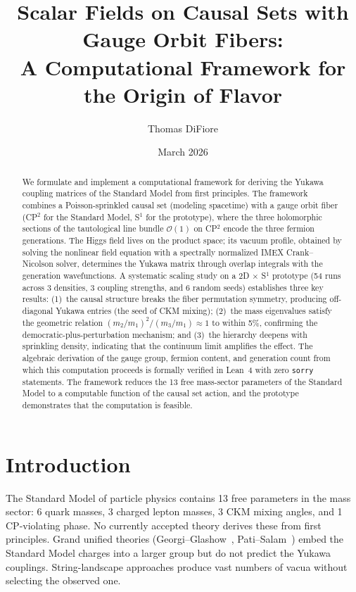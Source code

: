 \documentclass[12pt,a4paper]{article}
\title{Scalar Fields on Causal Sets with Gauge Orbit Fibers:\\
A Computational Framework for the Origin of Flavor}
\author{Thomas DiFiore}
\date{March 2026}
\begin{document}
\maketitle

\begin{abstract}
We formulate and implement a computational framework for deriving the
Yukawa coupling matrices of the Standard Model from first principles.
The framework combines a Poisson-sprinkled causal set (modeling
spacetime) with a gauge orbit fiber (CP$^2$ for the Standard Model,
S$^1$ for the prototype), where the three holomorphic sections of the
tautological line bundle $\mathcal{O}(1)$ on CP$^2$ encode the three
fermion generations.  The Higgs field lives on the product space; its
vacuum profile, obtained by solving the nonlinear field equation with
a spectrally normalized IMEX Crank--Nicolson solver, determines the
Yukawa matrix through overlap integrals with the generation
wavefunctions.  A systematic scaling study on a 2D $\times$ S$^1$
prototype (54 runs across 3 densities, 3 coupling strengths, and 6
random seeds) establishes three key results: (1)~the causal structure
breaks the fiber permutation symmetry, producing off-diagonal Yukawa
entries (the seed of CKM mixing); (2)~the mass eigenvalues satisfy the
geometric relation $(m_2/m_1)^2/(m_3/m_1) \approx 1$ to within 5\%,
confirming the democratic-plus-perturbation mechanism; and (3)~the
hierarchy deepens with sprinkling density, indicating that the
continuum limit amplifies the effect.  The algebraic derivation of the
gauge group, fermion content, and generation count from which this
computation proceeds is formally verified in Lean~4 with zero
\texttt{sorry} statements.  The framework reduces the 13 free
mass-sector parameters of the Standard Model to a computable function
of the causal set action, and the prototype demonstrates that the
computation is feasible.
\end{abstract}

\section{Introduction}

The Standard Model of particle physics contains 13 free parameters in
the mass sector: 6 quark masses, 3 charged lepton masses, 3 CKM
mixing angles, and 1 CP-violating phase.  No currently accepted theory
derives these from first principles.  Grand unified theories
(Georgi--Glashow~\cite{gg}, Pati--Salam~\cite{patisalam}) embed the
Standard Model charges into a larger group but do not predict the
Yukawa couplings.  String-landscape approaches produce vast numbers of
vacua without selecting the observed one.
\end{document}
